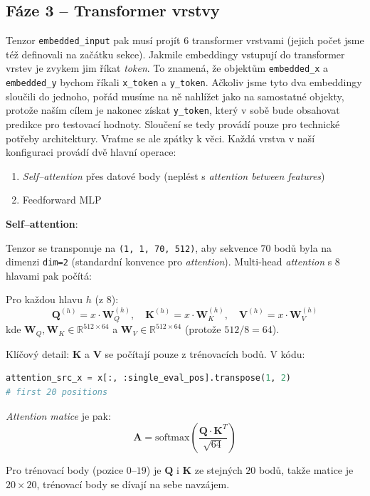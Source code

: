 \subsection{Fáze 3 – Transformer vrstvy}
\label{subsec:faze3-transformer}
Tenzor \texttt{embedded\_input} pak musí projít $6$ transformer vrstvami (jejich počet jsme též definovali na začátku sekce).
Jakmile embeddingy vstupují do transformer vrstev je zvykem jim říkat \emph{token}.
To znamená, že objektům \texttt{embedded\_x} a \texttt{embedded\_y} bychom říkali \texttt{x\_token} a \texttt{y\_token}.
Ačkoliv jsme tyto dva embeddingy sloučili do jednoho, pořád musíme na ně nahlížet jako na samostatné objekty, protože naším cílem je nakonec získat \texttt{y\_token}, který v sobě bude obsahovat predikce pro testovací hodnoty.
Sloučení se tedy provádí pouze pro technické potřeby architektury.
Vraťme se ale zpátky k věci.
Každá vrstva v naší konfiguraci provádí dvě hlavní operace:
\begin{enumerate}
    \item \emph{Self–attention} přes datové body (neplést s \emph{attention between features})
    \item Feedforward MLP
\end{enumerate}

\textbf{Self–attention}:

Tenzor se transponuje na \lstinline|(1, 1, 70, 512)|, aby sekvence $70$ bodů byla na dimenzi \lstinline|dim=2| (standardní konvence pro \emph{attention}).
Multi-head \emph{attention} s $8$ hlavami pak počítá:

Pro každou hlavu $h$ (z $8$):
$$\mathbf{Q}^{(h)} = x \cdot \mathbf{W}_Q^{(h)}, \quad \mathbf{K}^{(h)} = x \cdot \mathbf{W}_K^{(h)}, \quad \mathbf{V}^{(h)} = x \cdot \mathbf{W}_V^{(h)}$$
kde $\mathbf{W}_Q, \mathbf{W}_K \in \mathbb{R}^{512 \times 64}$ a $\mathbf{W}_V \in \mathbb{R}^{512 \times 64}$ (protože $512 / 8 = 64$).

Klíčový detail: $\mathbf{K}$ a $\mathbf{V}$ se počítají pouze z trénovacích bodů. V kódu:
\begin{lstlisting}[language=Python]
attention_src_x = x[:, :single_eval_pos].transpose(1, 2)  
# first 20 positions
\end{lstlisting}
\emph{Attention matice} je pak:
$$\mathbf{A} = \text{softmax}\left(\frac{\mathbf{Q} \cdot \mathbf{K}^T}{\sqrt{64}}\right)$$

Pro trénovací body (pozice $0$–$19$) je $\mathbf{Q}$ i $\mathbf{K}$ ze stejných $20$ bodů, takže matice je $20 \times 20$, trénovací body se dívají na sebe navzájem.

